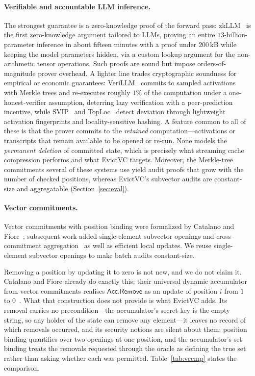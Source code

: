 \documentclass[version=submission]{iacrcc}
\theoremstyle{definition}
\begin{document}
\paragraph{Verifiable and accountable LLM inference.}
The strongest guarantee is a zero-knowledge proof of the forward pass:
zkLLM~\cite{zkllm} is the first zero-knowledge argument tailored to LLMs, proving
an entire $13$-billion-parameter inference in about fifteen minutes with a proof
under $200$\,kB while keeping the model parameters hidden, via a custom lookup
argument for the non-arithmetic tensor operations. Such proofs are sound but
impose orders-of-magnitude prover overhead. A lighter line trades cryptographic
soundness for empirical or economic guarantees: VeriLLM~\cite{verillm} commits to
sampled activations with Merkle trees and re-executes roughly $1\%$ of the
computation under a one-honest-verifier assumption, deterring lazy verification
with a peer-prediction incentive, while SVIP~\cite{svip} and
TopLoc~\cite{toploc} detect deviation through lightweight activation fingerprints
and locality-sensitive hashing. A feature common to all of these is that the
prover commits to the \emph{retained} computation---activations or transcripts
that remain available to be opened or re-run. None models the \emph{permanent
deletion} of committed state, which is precisely what streaming cache compression
performs and what EvictVC targets. Moreover, the Merkle-tree commitments several
of these systems use yield audit proofs that grow with the number of checked
positions, whereas EvictVC's subvector audits are constant-size and aggregatable
(Section~\ref{sec:eval}).

\paragraph{Vector commitments.}
Vector commitments with position binding were formalized by Catalano and
Fiore~\cite{PKC:CatFio13}; subsequent work added single-element subvector openings and
cross-commitment aggregation~\cite{SCN:TABDFK20} as well as efficient local updates.
We reuse single-element subvector openings to make batch audits constant-size.

Removing a position by updating it to zero is not new, and we do not claim it.
Catalano and Fiore already do exactly this: their universal dynamic accumulator
from vector commitments realises $\mathsf{Acc.Remove}$ as an update of position
$i$ from $1$ to $0$~\cite[\S6.1]{PKC:CatFio13}. What that construction does not
provide is what EvictVC adds. Its removal carries no precondition---the
accumulator's secret key is the empty string, so any holder of the state can
remove any element---it leaves no record of which removals occurred, and its
security notions are silent about them: position binding quantifies over two
openings at one position, and the accumulator's set binding treats the removals
requested through the oracle as defining the true set rather than asking whether
each was permitted. Table~\ref{tab:vccmp} states the comparison.
\end{document}
